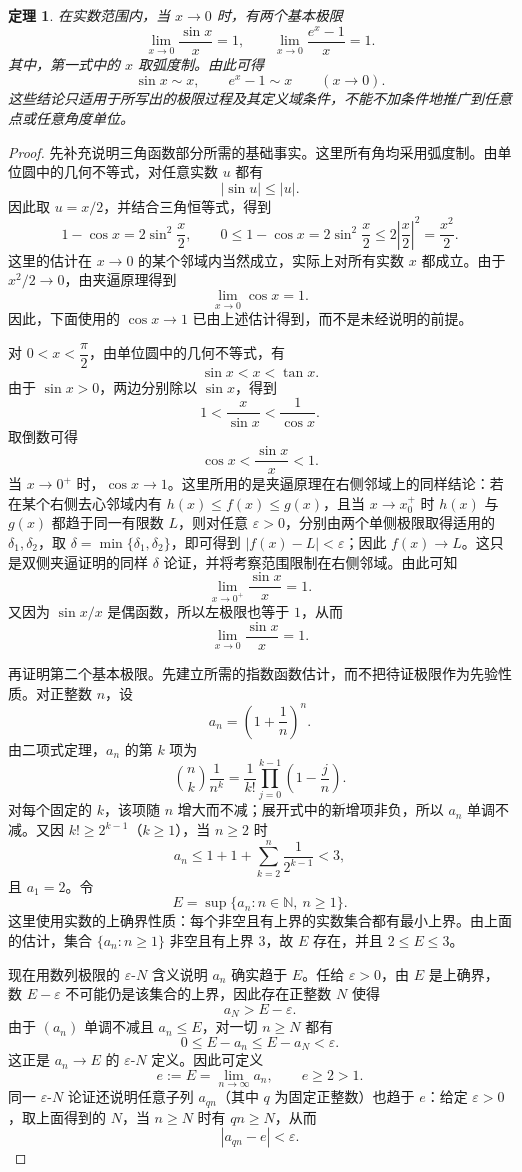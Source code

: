 \documentclass[UTF8,fontset=fandol,11pt]{ctexart}
\newtheorem{theorem}[definition]{定理}
\begin{document}
\begin{theorem}
在实数范围内，当 $x\to0$ 时，有两个基本极限
\[
\lim_{x\to0}\frac{\sin x}{x}=1,
\qquad
\lim_{x\to0}\frac{e^x-1}{x}=1.
\]
其中，第一式中的 $x$ 取弧度制。由此可得
\[
\sin x\sim x,
\qquad
 e^x-1\sim x\qquad(x\to0).
\]
这些结论只适用于所写出的极限过程及其定义域条件，不能不加条件地推广到任意点或任意角度单位。\label{thm:fundamental-limits}
\end{theorem}
\begin{proof}
先补充说明三角函数部分所需的基础事实。这里所有角均采用弧度制。由单位圆中的几何不等式，对任意实数 $u$ 都有
\[
|\sin u|\leq |u|.
\]
因此取 $u=x/2$，并结合三角恒等式，得到
\[
1-\cos x=2\sin^2\frac{x}{2},
\qquad
0\leq1-\cos x=2\sin^2\frac{x}{2}\leq2\left|\frac{x}{2}\right|^2=\frac{x^2}{2}.
\]
这里的估计在 $x\to0$ 的某个邻域内当然成立，实际上对所有实数 $x$ 都成立。由于 $x^2/2\to0$，由夹逼原理得到
\[
\lim_{x\to0}\cos x=1.
\]
因此，下面使用的 $\cos x\to1$ 已由上述估计得到，而不是未经说明的前提。

对 $0<x<\dfrac{\pi}{2}$，由单位圆中的几何不等式，有
\[
\sin x<x<\tan x.
\]
由于 $\sin x>0$，两边分别除以 $\sin x$，得到
\[
1<\frac{x}{\sin x}<\frac{1}{\cos x}.
\]
取倒数可得
\[
\cos x<\frac{\sin x}{x}<1.
\]
当 $x\to0^+$ 时，$\cos x\to1$。这里所用的是夹逼原理在右侧邻域上的同样结论：若在某个右侧去心邻域内有 $h(x)\leq f(x)\leq g(x)$，且当 $x\to x_0^+$ 时 $h(x)$ 与 $g(x)$ 都趋于同一有限数 $L$，则对任意 $\varepsilon>0$，分别由两个单侧极限取得适用的 $\delta_1,\delta_2$，取 $\delta=\min\{\delta_1,\delta_2\}$，即可得到 $|f(x)-L|<\varepsilon$；因此 $f(x)\to L$。这只是双侧夹逼证明的同样 $\delta$ 论证，并将考察范围限制在右侧邻域。由此可知
\[
\lim_{x\to0^+}\frac{\sin x}{x}=1.
\]
又因为 $\sin x/x$ 是偶函数，所以左极限也等于 $1$，从而
\[
\lim_{x\to0}\frac{\sin x}{x}=1.
\]

再证明第二个基本极限。先建立所需的指数函数估计，而不把待证极限作为先验性质。对正整数 $n$，设
\[
a_n=\left(1+\frac1n\right)^n.
\]
由二项式定理，$a_n$ 的第 $k$ 项为
\[
\binom nk\frac1{n^k}=\frac1{k!}\prod_{j=0}^{k-1}\left(1-\frac{j}{n}\right).
\]
对每个固定的 $k$，该项随 $n$ 增大而不减；展开式中的新增项非负，所以 $a_n$ 单调不减。又因 $k!\geq2^{k-1}$（$k\geq1$），当 $n\geq2$ 时
\[
a_n\leq1+1+\sum_{k=2}^n\frac1{2^{k-1}}<3,
\]
且 $a_1=2$。令
\[
E=\sup\{a_n:n\in\mathbb N,\ n\geq1\}.
\]
这里使用实数的上确界性质：每个非空且有上界的实数集合都有最小上界。由上面的估计，集合 $\{a_n:n\geq1\}$ 非空且有上界 $3$，故 $E$ 存在，并且 $2\leq E\leq3$。

现在用数列极限的 $\varepsilon$-$N$ 含义说明 $a_n$ 确实趋于 $E$。任给 $\varepsilon>0$，由 $E$ 是上确界，数 $E-\varepsilon$ 不可能仍是该集合的上界，因此存在正整数 $N$ 使得
\[
a_N>E-\varepsilon.
\]
由于 $(a_n)$ 单调不减且 $a_n\leq E$，对一切 $n\geq N$ 都有
\[
0\leq E-a_n\leq E-a_N<\varepsilon.
\]
这正是 $a_n\to E$ 的 $\varepsilon$-$N$ 定义。因此可定义
\[
e:=E=\lim_{n\to\infty}a_n,
\qquad e\geq2>1.
\]
同一 $\varepsilon$-$N$ 论证还说明任意子列 $a_{qn}$（其中 $q$ 为固定正整数）也趋于 $e$：给定 $\varepsilon>0$，取上面得到的 $N$，当 $n\geq N$ 时有 $qn\geq N$，从而
\[
|a_{qn}-e|<\varepsilon.
\]


\end{proof}
\end{document}

